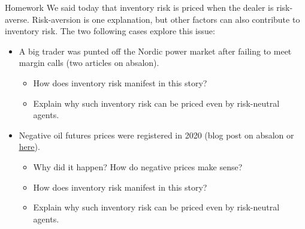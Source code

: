\documentclass[english,10pt
,aspectratio=169
]{beamer}
\begin{document}
\begin{frame}{Homework}
	We said today that inventory risk is priced when the dealer is risk-averse. Risk-aversion is one explanation, but other factors can also contribute to inventory risk.
	The two following cases explore this issue:
	\begin{itemize}
		\item A big trader was punted off the Nordic power market after failing to meet margin calls (two articles on absalon).
		\begin{itemize}
			\item How does inventory risk manifest in this story?
			\item Explain why such inventory risk can be priced even by risk-neutral agents.
		\end{itemize}
		\item Negative oil futures prices were registered in 2020 (blog post on absalon or \href{https://streetwiseprofessor.com/wti-wtf/}{\uline{here}}).
		\begin{itemize}
			\item Why did it happen? How do negative prices make sense?
			\item How does inventory risk manifest in this story?
			\item Explain why such inventory risk can be priced even by risk-neutral agents.
		\end{itemize}
	\end{itemize}
\end{frame}
\end{document}
